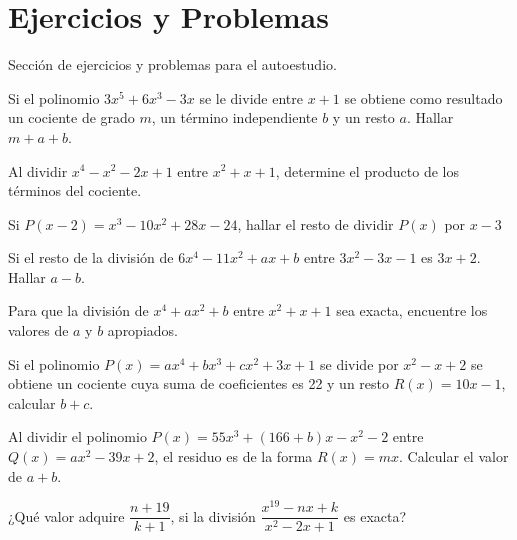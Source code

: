 {    \section{Ejercicios y Problemas}
    {
        Sección de ejercicios y problemas para el autoestudio.
    
        \begin{section-problem}
            Si el polinomio $3x^5 + 6x^3 - 3x$ se le divide entre $x + 1$ se obtiene como resultado un cociente de grado $m$, un término independiente $b$ y un resto $a$. Hallar $m + a + b$.
        \end{section-problem}

        \begin{section-problem}
            Al dividir $x^4 - x^2 - 2x + 1$ entre $x^2 + x + 1$, determine el producto de los términos del cociente.
        \end{section-problem}

        \begin{section-problem}
            Si $P(x - 2) = x^3 - 10x^2 + 28x - 24$, hallar el resto de dividir $P(x)$ por $x - 3$
        \end{section-problem}

        \begin{section-problem}
            Si el resto de la división de $6x^4 - 11x^2 + ax + b$ entre $3x^2 - 3x - 1$ es $3x + 2$. Hallar $a - b$.
        \end{section-problem}

        \begin{section-problem}
            Para que la división de $x^4 + ax^2 + b$ entre $x^2 + x + 1$ sea exacta, encuentre los valores de $a$ y $b$ apropiados.
        \end{section-problem}

        \begin{section-problem}
            Si el polinomio $P(x) = ax^4 + bx^3 + cx^2 + 3x + 1$ se divide por $x^2 - x + 2$ se obtiene un cociente cuya suma de coeficientes es 22 y un resto $R(x) = 10x - 1$, calcular $b + c$.
        \end{section-problem}

        \begin{section-problem}
            Al dividir el polinomio $P(x) = 55x^3 + (166 + b)x - x^2 - 2$ entre $Q(x) = ax^2 - 39x + 2$, el residuo es de la forma $R(x) = mx$. Calcular el valor de $a + b$.
        \end{section-problem}

        \begin{section-problem}
            ¿Qué valor adquire $\dfrac{n + 19}{k + 1}$, si la división $\dfrac{x^{19} - nx + k}{x^2 - 2x + 1}$ es exacta?
        \end{section-problem}
    }
}